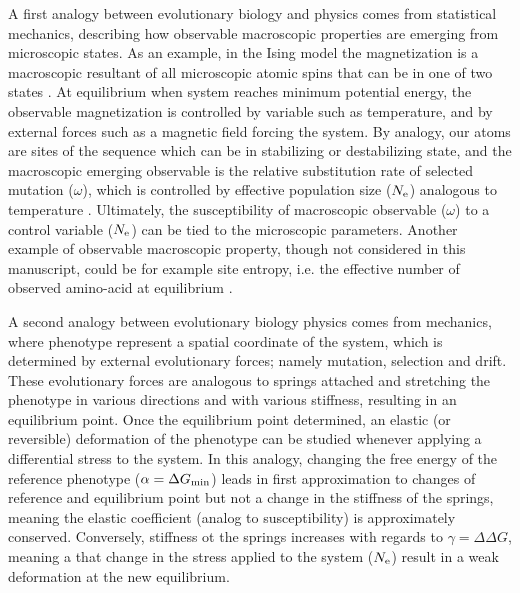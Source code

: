 A first analogy between evolutionary biology and physics comes from statistical mechanics, describing how observable macroscopic properties are emerging from microscopic states.
As an example, in the Ising model the magnetization is a macroscopic resultant of all microscopic atomic spins that can be in one of two states \citep{Brush1967}.
At equilibrium when system reaches minimum potential energy, the observable magnetization is controlled by variable such as temperature, and by external forces such as a magnetic field forcing the system.
By analogy, our atoms are sites of the sequence which can be in stabilizing or destabilizing state, and the macroscopic emerging observable is the relative substitution rate of selected mutation ($\omega$), which is controlled by effective population size ($N_{\mathrm{e}}$) analogous to temperature \cite{Sella2005}.
Ultimately, the susceptibility of macroscopic observable ($\omega$) to a control variable ($N_{\mathrm{e}}$) can be tied to the microscopic parameters.
Another example of observable macroscopic property, though not considered in this manuscript, could be for example site entropy, i.e. the effective number of observed amino-acid at equilibrium \citep{Goldstein2016, Jimenez2018, Jiang2018}. 

A second analogy between evolutionary biology physics comes from mechanics, where phenotype represent a spatial coordinate of the system, which is determined by external evolutionary forces; namely mutation, selection and drift.
These evolutionary forces are analogous to springs attached and stretching the phenotype in various directions and with various stiffness, resulting in an equilibrium point.
Once the equilibrium point determined, an elastic (or reversible) deformation of the phenotype can be studied whenever applying a differential stress to the system.
In this analogy, changing the free energy of the reference phenotype ($\alpha = \Delta G_{\text{min}}$) leads in first approximation to changes of reference and equilibrium point but not a change in the stiffness of the springs, meaning the elastic coefficient (analog to susceptibility) is approximately conserved.
Conversely, stiffness ot the springs increases with regards to $\gamma = \Delta \Delta G$, meaning a that change in the stress applied to the system ($N_{\mathrm{e}}$) result in a weak deformation at the new equilibrium.

